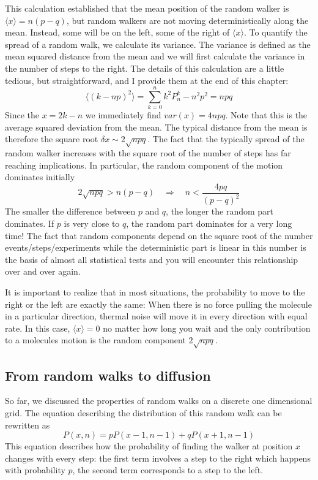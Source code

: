 This calculation established that the mean position of the random walker is $\langle x\rangle = n(p-q)$, but random walkers are not moving deterministically along the mean.
Instead, some will be on the left, some of the right of $\langle x\rangle$.
To quantify the spread of a random walk, we calculate its variance.
The variance is defined as the mean squared distance from the mean and we will first calculate the variance in the number of steps to the right.
The details of this calculation are a little tedious, but straightforward, and I provide them at the end of this chapter:
\begin{equation}
	\langle (k - np)^2 \rangle = \sum_{k=0}^n k^2 P_n^k - n^2p^2 = npq
\end{equation}
Since the $x=2k-n$ we immediately find $var(x) = 4npq$.
Note that this is the average squared deviation from the mean.
The typical distance from the mean is therefore the square root $\delta x \sim 2\sqrt{npq}$.
The fact that the typically spread of the random walker increases with the square root of the number of steps has far reaching implications.
In particular, the random component of the motion dominates initially
\begin{equation}
	2\sqrt{npq} > n(p-q) \quad \Rightarrow \quad n < \frac{4pq}{(p-q)^2}
\end{equation}
The smaller the difference between $p$ and $q$, the longer the random part dominates.
If $p$ is very close to $q$, the random part dominates for a very long time!
The fact that random components depend on the square root of the number events/steps/experiments while the deterministic part is linear in this number is the basis of almost all statistical tests and you will encounter this relationship over and over again.

It is important to realize that in most situations, the probability to move to the right or the left are exactly the same: When there is no force pulling the molecule in a particular direction, thermal noise will move it in every direction with equal rate.
In this case, $\langle x \rangle = 0$ no matter how long you wait and the only contribution to a molecules motion is the random component $2\sqrt{npq}$.

\subsection{From random walks to diffusion}
So far, we discussed the properties of random walks on a discrete one dimensional grid.
The equation describing the distribution of this random walk can be rewritten as
\begin{equation}
	P(x,n) = p P(x-1,n-1) + q P(x+1,n-1)
\end{equation}
This equation describes how the probability of finding the walker at position $x$ changes with every step: the first term involves a step to the right which happens with probability $p$, the second term corresponds to a step to the left.


